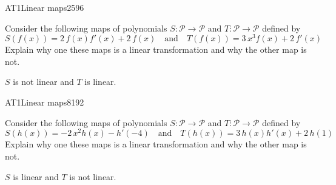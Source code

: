 \begin{exercise}{AT1}{Linear maps}{2596} 
\begin{exerciseStatement} 

 Consider the following maps of polynomials \(S:\mathcal{P}\rightarrow\mathcal{P}\) and \(T:\mathcal{P}\rightarrow\mathcal{P}\) defined by \[
            S(f(x))=
                    2 \, f\left(x\right) f'\left(x\right) + 2 \, f\left(x\right)
                \hspace{1em} \text{and} \hspace{1em}
            T(f(x))=
                    3 \, x^{3} f\left(x\right) + 2 \, f'\left(x\right)
        \] Explain why one these maps is a linear transformation and why the other map is not. 

 \end{exerciseStatement}
 \begin{exerciseAnswer} 

\(S\) is not linear and \(T\) is linear.

 \end{exerciseAnswer}
 \end{exercise}


\begin{exercise}{AT1}{Linear maps}{8192} 
\begin{exerciseStatement} 

 Consider the following maps of polynomials \(S:\mathcal{P}\rightarrow\mathcal{P}\) and \(T:\mathcal{P}\rightarrow\mathcal{P}\) defined by \[
            S(h(x))=
                    -2 \, x^{2} h\left(x\right) - h'\left(-4\right)
                \hspace{1em} \text{and} \hspace{1em}
            T(h(x))=
                    3 \, h\left(x\right) h'\left(x\right) + 2 \, h\left(1\right)
        \] Explain why one these maps is a linear transformation and why the other map is not. 

 \end{exerciseStatement}
 \begin{exerciseAnswer} 

\(S\) is linear and \(T\) is not linear.

 \end{exerciseAnswer}
 \end{exercise}


